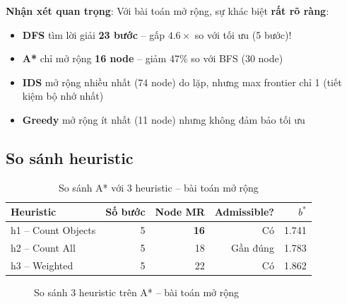 \documentclass[a4paper,12pt]{article}
\begin{document}
\textbf{Nhận xét quan trọng}: Với bài toán mở rộng, sự khác biệt \textbf{rất rõ ràng}:
\begin{itemize}
    \item \textbf{DFS} tìm lời giải \textbf{23 bước} -- gấp $4.6\times$ so với tối ưu (5 bước)!
    \item \textbf{A*} chỉ mở rộng \textbf{16 node} -- giảm 47\% so với BFS (30 node)
    \item \textbf{IDS} mở rộng nhiều nhất (74 node) do lặp, nhưng max frontier chỉ 1 (tiết kiệm bộ nhớ nhất)
    \item \textbf{Greedy} mở rộng ít nhất (11 node) nhưng không đảm bảo tối ưu
\end{itemize}

\subsection{So sánh heuristic}

\begin{table}[H]
\centering
\caption{So sánh A* với 3 heuristic -- bài toán mở rộng}
\label{tab:heuristic_ext}
\begin{tabular}{@{}lrrrr@{}}
\toprule
\textbf{Heuristic} & \textbf{Số bước} & \textbf{Node MR} & \textbf{Admissible?} & \textbf{$b^*$} \\
\midrule
h1 -- Count Objects & 5 & \textbf{16} & Có & 1.741 \\
h2 -- Count All & 5 & 18 & Gần đúng & 1.783 \\
h3 -- Weighted & 5 & 22 & Có & 1.862 \\
\bottomrule
\end{tabular}
\end{table}

\begin{figure}[H]
\centering
{}
\caption{So sánh 3 heuristic trên A* -- bài toán mở rộng}
\label{fig:heuristic_cmp}
\end{figure}
\end{document}
